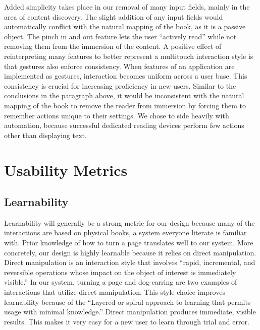 \documentclass[11pt, oneside]{article}   	%
\begin{document}
Added simplicity takes place in our removal of many input fields, mainly in the area of content discovery. The slight addition of any input fields would automatically conflict with the natural mapping of the book, as it is a passive object. The pinch in and out feature lets the user ``actively read'' while not removing them from the immersion of the content. A positive effect of reinterpreting many features to better represent a multitouch interaction style is that gestures also enforce consistency. When features of an application are implemented as gestures, interaction becomes uniform across a user base. This consistency is crucial for increasing proficiency in new users. Similar to the conclusions in the paragraph above, it would be inconsistent with the natural mapping of the book to remove the reader from immersion by forcing them to remember actions unique to their settings. We chose to side heavily with automation, because successful dedicated reading devices perform few actions other than displaying text.

\section{Usability Metrics}
\subsection {Learnability}
Learnability will generally be a strong metric for our design because many of the interactions are based on physical books, a system everyone literate is familiar with. Prior knowledge of how to turn a page translates well to our system. More concretely, our design is highly learnable because it relies on direct manipulation. Direct manipulation is an interaction style that involves ``rapid, incremental, and reversible operations whose impact on the object of interest is immediately visible.'' \cite{Kwon} In our system, turning a page and dog-earring are two examples of interactions that utilize direct manipulation. This style choice improves learnability because of the ``Layered or spiral approach to learning that permits usage
with minimal knowledge.'' \cite{Kwon} Direct manipulation produces immediate, visible results. This makes it very easy for a new user to learn through trial and error.
\end{document}
